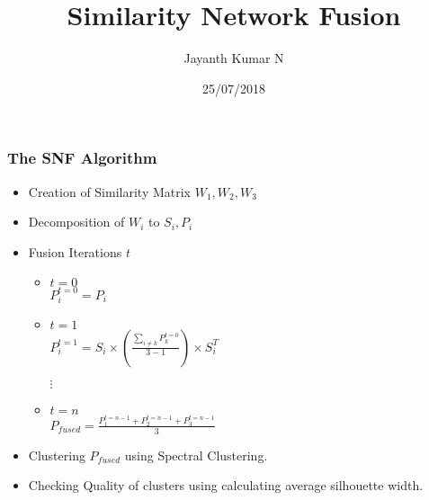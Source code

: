 \documentclass{beamer}
\title{Similarity Network Fusion}
\author{Jayanth Kumar N}
\institute{IISER Pune}
\date{25/07/2018}
\begin{document}
\begin{frame}
\frametitle{The SNF Algorithm}
\begin{itemize}
 \item Creation of Similarity Matrix $W_{1},W_{2},W_{3}$ 
 \item Decomposition of $W_{i}$ to $S_{i},P_{i}$
 \item Fusion Iterations $t$
   \begin{itemize}
   \item $t=0$ \\ $P_{i}^{t=0}=P_{i}$
   \item $t=1$ \\ $P_{i}^{t=1}=S_{i} \times (\frac{\sum_{i \neq k}P_{k}^{t=0}}{3-1}) \times S_{i}^{T}$
   \item[$\vdots$]
   \item $t=n$ \\ $P_{fused}=\frac{P_{1}^{t=n-1}+P_{2}^{t=n-1}+P_{3}^{t=n-1}}{3}$
   \end{itemize}
 \item Clustering $P_{fused}$ using Spectral Clustering.
 \item Checking Quality of clusters using calculating average silhouette width.
\end{itemize}
\end{frame}
\end{document}
